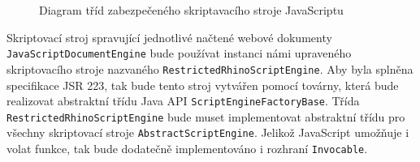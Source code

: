 \begin{figure}[H]
  \begin{center}
    \caption{Diagram tříd zabezpečeného skriptavacího stroje JavaScriptu}
    \label{Figure.JavaScriptEngineJSR223Design}
  \end{center}
\end{figure}

Skriptovací stroj spravující jednotlivé načtené webové dokumenty \texttt{JavaScriptDocumentEngine} bude používat instanci námi upraveného skriptovacího stroje nazvaného \texttt{RestrictedRhinoScriptEngine}. Aby byla splněna specifikace JSR 223, tak bude tento stroj vytvářen pomocí továrny, která bude realizovat abstraktní třídu Java API \texttt{ScriptEngineFactoryBase}. Třída \texttt{RestrictedRhinoScriptEngine} bude muset implementovat abstraktní třídu pro všechny skriptovací stroje \texttt{AbstractScriptEngine}. Jelikož JavaScript umožňuje i volat funkce, tak bude dodatečně implementováno i rozhraní \texttt{Invocable}. 

